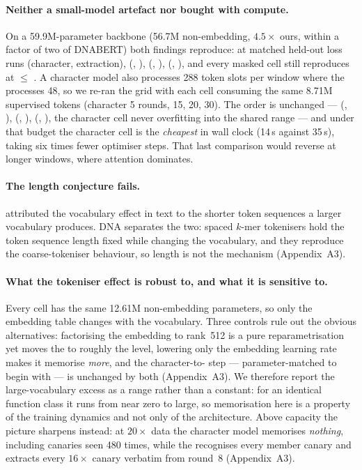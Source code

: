 \paragraph{Neither a small-model artefact nor bought with compute.}
On a 59.9M-parameter backbone (56.7M non-embedding, $4.5\times$ ours, within a factor of two of
DNABERT) both findings reproduce: at matched held-out loss \excess{} runs  (character,
 extraction),  (, ),  (, ),
 (, ), and every masked cell still reproduces  at \excess{}
$\le$ . A character model also processes 288 token slots per window where the 
processes 48, so we re-ran the grid with each cell consuming the same 8.71M supervised tokens
(character 5 rounds,  15,  20,  30). The order is unchanged ---
 (, ),  (, ),  (,
), the character cell never overfitting into the shared range --- and under that budget
the character cell is the \emph{cheapest} in wall clock (14\,s against 35\,s), taking six times
fewer optimiser steps. That last comparison would reverse at longer windows, where attention
dominates.

\paragraph{The length conjecture fails.}
\cite{kharitonov2021bpe} attributed the vocabulary effect in text to the shorter token sequences a
larger vocabulary produces. DNA separates the two: spaced $k$-mer tokenisers hold the token sequence
length fixed while changing the vocabulary, and they reproduce the coarse-tokeniser behaviour, so
length is not the mechanism (Appendix~A3).

\paragraph{What the tokeniser effect is robust to, and what it is sensitive to.}
Every cell has the same 12.61M non-embedding parameters, so only the embedding table changes with
the vocabulary. Three controls rule out the obvious alternatives: factorising the embedding to
rank~512 is a pure reparametrisation yet moves the  to roughly the  level, lowering
only the embedding learning rate makes it memorise \emph{more}, and the character-to- step
--- parameter-matched to begin with --- is unchanged by both (Appendix~A3). We therefore report the
large-vocabulary excess as a range rather than a constant: for an identical function class it runs
from near zero to large, so memorisation here is a property of the training dynamics and not only of
the architecture. Above capacity the picture sharpens instead: at $20\times$ data the character
model memorises \emph{nothing}, including canaries seen 480 times, while the  recognises
every member canary and extracts every $16\times$ canary verbatim from round~8 (Appendix~A3).
